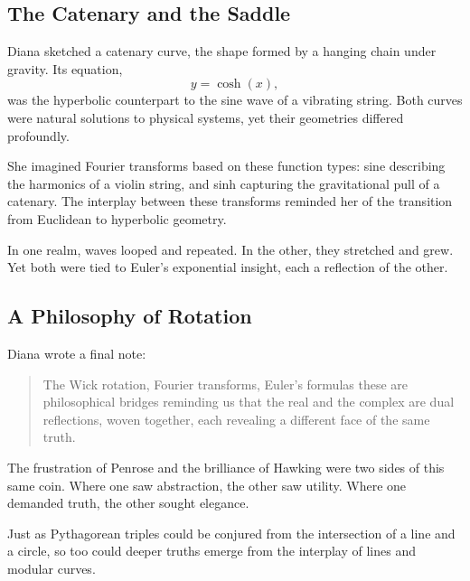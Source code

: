 \subsection*{The Catenary and the Saddle}

Diana sketched a catenary curve, the shape formed by a hanging chain under gravity. Its equation, 
\[
y = \cosh(x),
\]
was the hyperbolic counterpart to the sine wave of a vibrating string. Both curves were natural solutions to physical systems, yet their geometries differed profoundly.

She imagined Fourier transforms based on these function types: sine describing the harmonics of a violin string, and sinh capturing the gravitational pull of a catenary. The interplay between these transforms reminded her of the transition from Euclidean to hyperbolic geometry.

In one realm, waves looped and repeated. In the other, they stretched and grew. Yet both were tied to Euler’s exponential insight, each a reflection of the other.


\subsection*{A Philosophy of Rotation}

Diana wrote a final note:
\begin{quote}
The Wick rotation, Fourier transforms, Euler’s formulas these are  philosophical bridges reminding us that the real and the complex are dual reflections, woven together, each revealing a different face of the same truth.
\end{quote}

The frustration of Penrose and the brilliance of Hawking were two sides of this same coin. Where one saw abstraction, the other saw utility. Where one demanded truth, the other sought elegance.


Just as Pythagorean triples could be conjured from the intersection of a line and a circle, so too could deeper truths emerge from the interplay of lines and modular curves. 




